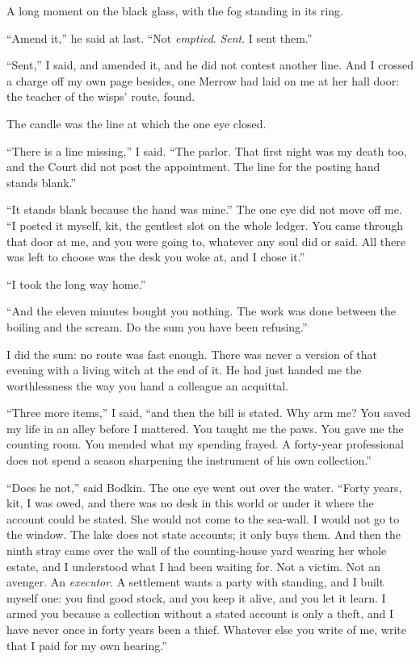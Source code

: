 A long moment on the black glass, with the fog standing in its ring.

``Amend it,'' he said at last. ``Not \emph{emptied}. \emph{Sent}. I sent them.''

``Sent,'' I said, and amended it, and he did not contest another line. And I crossed a charge off my own page besides, one Merrow had laid on me at her hall door: the teacher of the wisps' route, found.

The candle was the line at which the one eye closed.

``There is a line missing,'' I said. ``The parlor. That first night was my death too, and the Court did not post the appointment. The line for the posting hand stands blank.''

``It stands blank because the hand was mine.'' The one eye did not move off me. ``I posted it myself, kit, the gentlest slot on the whole ledger. You came through that door at me, and you were going to, whatever any soul did or said. All there was left to choose was the desk you woke at, and I chose it.''

``I took the long way home.''

``And the eleven minutes bought you nothing. The work was done between the boiling and the scream. Do the sum you have been refusing.''

I did the sum: no route was fast enough. There was never a version of that evening with a living witch at the end of it. He had just handed me the worthlessness the way you hand a colleague an acquittal.

``Three more items,'' I said, ``and then the bill is stated. Why arm me? You saved my life in an alley before I mattered. You taught me the paws. You gave me the counting room. You mended what my spending frayed. A forty-year professional does not spend a season sharpening the instrument of his own collection.''

``Does he not,'' said Bodkin. The one eye went out over the water. ``Forty years, kit, I was owed, and there was no desk in this world or under it where the account could be stated. She would not come to the sea-wall. I would not go to the window. The lake does not state accounts; it only buys them. And then the ninth stray came over the wall of the counting-house yard wearing her whole estate, and I understood what I had been waiting for. Not a victim. Not an avenger. An \emph{executor}. A settlement wants a party with standing, and I built myself one: you find good stock, and you keep it alive, and you let it learn. I armed you because a collection without a stated account is only a theft, and I have never once in forty years been a thief. Whatever else you write of me, write that I paid for my own hearing.''

